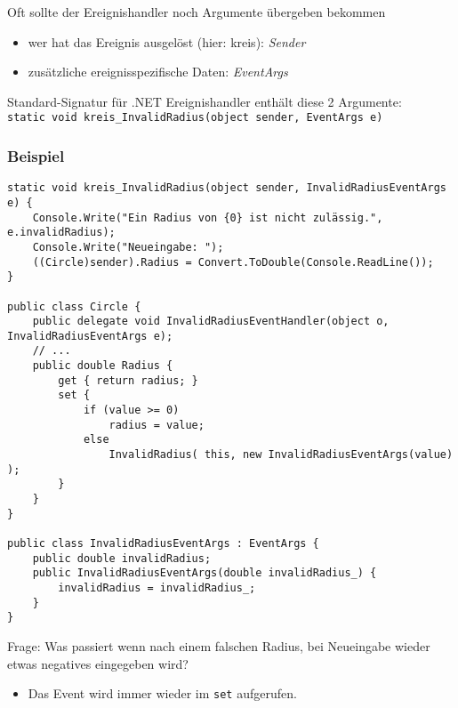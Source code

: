 Oft sollte der Ereignishandler noch Argumente übergeben bekommen
\begin{itemize}
\item wer hat das Ereignis ausgelöst (hier: kreis): \emph{Sender}
\item zusätzliche ereignisspezifische Daten: \emph{EventArgs}
\end{itemize}
Standard-Signatur für .NET Ereignishandler enthält diese 2 Argumente:\\
\lstinline$static void kreis_InvalidRadius(object sender, EventArgs e)$

\subsubsection*{Beispiel}
\begin{lstlisting}[language={[Sharp]C}]
static void kreis_InvalidRadius(object sender, InvalidRadiusEventArgs e) {
	Console.Write("Ein Radius von {0} ist nicht zulässig.", e.invalidRadius);
	Console.Write("Neueingabe: ");
	((Circle)sender).Radius = Convert.ToDouble(Console.ReadLine());
}

public class Circle {
	public delegate void InvalidRadiusEventHandler(object o, InvalidRadiusEventArgs e);
	// ...
	public double Radius {
		get { return radius; }
		set {
			if (value >= 0)
				radius = value;
			else 
				InvalidRadius( this, new InvalidRadiusEventArgs(value) );
		}
	}
}

public class InvalidRadiusEventArgs : EventArgs {
	public double invalidRadius;
	public InvalidRadiusEventArgs(double invalidRadius_) {
		invalidRadius = invalidRadius_;
	}
}
\end{lstlisting}

Frage: Was passiert wenn nach einem falschen Radius, bei Neueingabe wieder etwas negatives eingegeben wird?

\begin{itemize}
\item Das Event wird immer wieder im \lstinline$set$ aufgerufen.
\end{itemize}